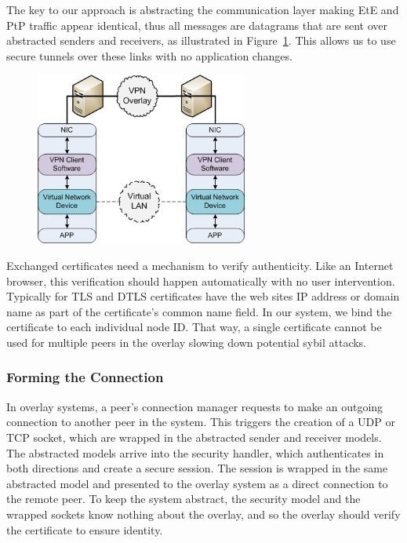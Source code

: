 \documentclass[conference]{IEEEtran}
\begin{document}
The key to our approach is abstracting the communication layer making EtE and
PtP traffic appear identical, thus all messages are datagrams that are sent
over abstracted senders and receivers, as illustrated in
Figure~\ref{fig:senders_receivers}.  This allows us to use secure tunnels over
these links with no application changes.

\begin{figure}[ht]
\centering
\includegraphics[width=2.75in]{vpn.png.eps}
\caption{}
\label{fig:senders_receivers}
\end{figure}

Exchanged certificates need a mechanism to verify authenticity.  Like an
Internet browser, this verification should happen automatically with no user
intervention.  Typically for TLS and DTLS certificates have the web sites
IP address or domain name as part of the certificate's common name field.  In
our system, we bind the certificate to each individual node ID.  That way,
a single certificate cannot be used for multiple peers in the overlay slowing
down potential sybil attacks.

\subsubsection{Forming the Connection}
In overlay systems, a peer's connection manager requests to make an outgoing
connection to another peer in the system.  This triggers the creation of a
UDP or TCP socket, which are wrapped in the abstracted sender and receiver
models.  The abstracted models arrive into the security handler, which
authenticates in both directions and create a secure session.  The session is
wrapped in the same abstracted model and presented to the overlay system as a
direct connection to the remote peer.  To keep the system abstract, the security
model and the wrapped sockets know nothing about the overlay, and so the overlay
should verify the certificate to ensure identity.
\end{document}
